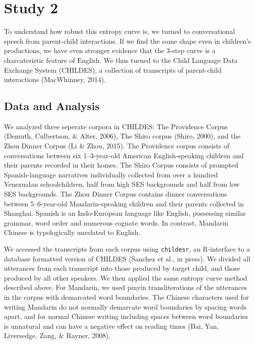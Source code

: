 \documentclass[10pt, letterpaper]{article}
\begin{document}
\hypertarget{study-2}{%
\section{Study 2}\label{study-2}}

To understand how robust this entropy curve is, we turned to
conversational speech from parent-child interactions. If we find the
same shape even in children's productions, we have even stronger
evidence that the 3-step curve is a charcateristic feature of English.
We thus turned to the Child Language Data Exchange System (CHILDES), a
collection of transcripts of parent-child interactions (MacWhinney,
2014).

\hypertarget{data-and-analysis-1}{%
\subsection{Data and Analysis}\label{data-and-analysis-1}}

We analyzed three seperate corpora in CHILDES: The Providence Corpus
(Demuth, Culbertson, \& Alter, 2006), The Shiro corpus (Shiro, 2000),
and the Zhou Dinner Corpus (Li \& Zhou, 2015). The Providence corpus
consists of conversations between six 1--3-year-old American
English-speaking children and their parents recorded in their homes. The
Shiro Corpus consists of prompted Spanish-language narratives
individually collected from over a hundred Venezualan schoolchildren,
half from high SES backgrounds and half from low SES backgrounds. The
Zhou Dinner Corpus contains dinner conversations between 5--6-year-old
Mandarin-speaking children and their parents collected in Shanghai.
Spanish is an Indo-European language like English, possessing similar
grammar, word order and numerous cognate words. In contrast, Mandarin
Chinese is typologically unrelated to English.

We accessed the transcripts from each corpus using \texttt{childesr}, an
R-interface to a database formatted version of CHILDES (Sanchez et al.,
in press). We divided all utterances from each transcript into those
produced by target child, and those produced by all other speakers. We
then applied the same entropy curve method described above. For
Mandarin, we used pinyin transliterations of the utterances in the
corpus with demarcated word boundaries. The Chinese characters used for
writing Mandarin do not normally demarcate word boundaries by spacing
words apart, and for normal Chinese writing including spaces between
word boundaries is unnatural and can have a negative effect on reading
times (Bai, Yan, Liversedge, Zang, \& Rayner, 2008).
\end{document}
